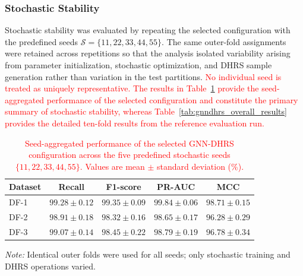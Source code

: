 \documentclass[pdflatex,sn-mathphys-num]{sn-jnl}%
\theoremstyle{thmstyleone}%
\theoremstyle{thmstyletwo}%
\theoremstyle{thmstylethree}%
\begin{document}
\subsubsection{ {Stochastic Stability}}
\label{subsubsec:random_seed_stability}

{
Stochastic stability was evaluated by repeating the selected configuration
with the predefined seeds
\(\mathcal{S}=\{11,22,33,44,55\}\). The same outer-fold assignments were
retained across repetitions so that the analysis isolated variability arising
from parameter initialization, stochastic optimization, and DHRS sample
generation rather than variation in the test partitions.
\textcolor{red}{
No individual seed is treated as uniquely representative. The results in
Table~\ref{tab:random_seed_stability} provide the seed-aggregated performance
of the selected configuration and constitute the primary summary of
stochastic stability, whereas Table~\ref{tab:gnndhrs_overall_results}
provides the detailed ten-fold results from the reference evaluation run.
}
}

\begin{table}[!ht]
\centering
\caption{
\textcolor{red}{
Seed-aggregated performance of the selected GNN-DHRS configuration across
the five predefined stochastic seeds
\(\{11,22,33,44,55\}\). Values are mean \(\pm\) standard deviation (\%).
}
}
\label{tab:random_seed_stability}
\small
\setlength{\tabcolsep}{6pt}
\renewcommand{\arraystretch}{1.08}
\begin{tabular}{@{}lcccc@{}}
\toprule
\textbf{Dataset} &
\textbf{Recall} &
\textbf{F1-score} &
\textbf{PR-AUC} &
\textbf{MCC} \\
\midrule
DF-1 &
 {$99.28\pm0.12$} &
 {$99.35\pm0.09$} &
 {$99.84\pm0.06$} &
 {$98.71\pm0.15$} \\
DF-2 &
 {$98.91\pm0.18$} &
 {$98.32\pm0.16$} &
 {$98.65\pm0.17$} &
 {$96.28\pm0.29$} \\
DF-3 &
 {$99.07\pm0.14$} &
 {$98.45\pm0.22$} &
 {$98.79\pm0.19$} &
 {$96.78\pm0.34$} \\
\bottomrule
\end{tabular}

\vspace{2pt}
\begin{minipage}{0.97\textwidth}
\footnotesize
\textit{Note:} Identical outer folds were used for all seeds; only stochastic
training and DHRS operations varied.
\end{minipage}
\end{table}
\end{document}
